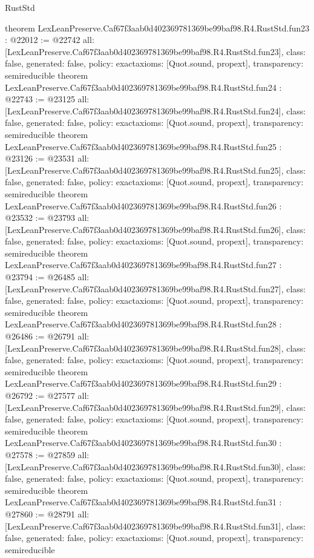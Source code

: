 \begin{lexlean}{RustStd}
\begin{coremodule}
{}
theorem LexLeanPreserve.Caf67f3aab0d402369781369be99baf98.R4.RustStd.fun23 : @22012 := @22742 {
  all: [LexLeanPreserve.Caf67f3aab0d402369781369be99baf98.R4.RustStd.fun23],
  class: false,
  generated: false,
  policy: exact{axioms: [Quot.sound, propext]},
  transparency: semireducible
}
theorem LexLeanPreserve.Caf67f3aab0d402369781369be99baf98.R4.RustStd.fun24 : @22743 := @23125 {
  all: [LexLeanPreserve.Caf67f3aab0d402369781369be99baf98.R4.RustStd.fun24],
  class: false,
  generated: false,
  policy: exact{axioms: [Quot.sound, propext]},
  transparency: semireducible
}
theorem LexLeanPreserve.Caf67f3aab0d402369781369be99baf98.R4.RustStd.fun25 : @23126 := @23531 {
  all: [LexLeanPreserve.Caf67f3aab0d402369781369be99baf98.R4.RustStd.fun25],
  class: false,
  generated: false,
  policy: exact{axioms: [Quot.sound, propext]},
  transparency: semireducible
}
theorem LexLeanPreserve.Caf67f3aab0d402369781369be99baf98.R4.RustStd.fun26 : @23532 := @23793 {
  all: [LexLeanPreserve.Caf67f3aab0d402369781369be99baf98.R4.RustStd.fun26],
  class: false,
  generated: false,
  policy: exact{axioms: [Quot.sound, propext]},
  transparency: semireducible
}
theorem LexLeanPreserve.Caf67f3aab0d402369781369be99baf98.R4.RustStd.fun27 : @23794 := @26485 {
  all: [LexLeanPreserve.Caf67f3aab0d402369781369be99baf98.R4.RustStd.fun27],
  class: false,
  generated: false,
  policy: exact{axioms: [Quot.sound, propext]},
  transparency: semireducible
}
theorem LexLeanPreserve.Caf67f3aab0d402369781369be99baf98.R4.RustStd.fun28 : @26486 := @26791 {
  all: [LexLeanPreserve.Caf67f3aab0d402369781369be99baf98.R4.RustStd.fun28],
  class: false,
  generated: false,
  policy: exact{axioms: [Quot.sound, propext]},
  transparency: semireducible
}
theorem LexLeanPreserve.Caf67f3aab0d402369781369be99baf98.R4.RustStd.fun29 : @26792 := @27577 {
  all: [LexLeanPreserve.Caf67f3aab0d402369781369be99baf98.R4.RustStd.fun29],
  class: false,
  generated: false,
  policy: exact{axioms: [Quot.sound, propext]},
  transparency: semireducible
}
theorem LexLeanPreserve.Caf67f3aab0d402369781369be99baf98.R4.RustStd.fun30 : @27578 := @27859 {
  all: [LexLeanPreserve.Caf67f3aab0d402369781369be99baf98.R4.RustStd.fun30],
  class: false,
  generated: false,
  policy: exact{axioms: [Quot.sound, propext]},
  transparency: semireducible
}
theorem LexLeanPreserve.Caf67f3aab0d402369781369be99baf98.R4.RustStd.fun31 : @27860 := @28791 {
  all: [LexLeanPreserve.Caf67f3aab0d402369781369be99baf98.R4.RustStd.fun31],
  class: false,
  generated: false,
  policy: exact{axioms: [Quot.sound, propext]},
  transparency: semireducible
}
\end{coremodule}
\end{lexlean}
